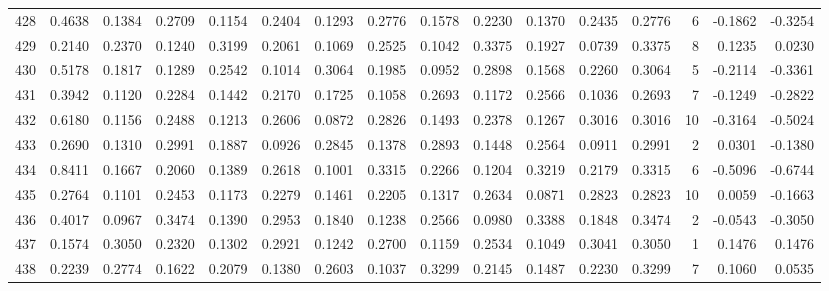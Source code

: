 \begin{tabular}{lrrrrrrrrrrrrrrr}
428 &      0.4638 &  0.1384 &  0.2709 &  0.1154 &  0.2404 &  0.1293 &  0.2776 &  0.1578 &  0.2230 &  0.1370 &   0.2435 &     0.2776 &      6 &                   -0.1862 &                    -0.3254 \\
429 &      0.2140 &  0.2370 &  0.1240 &  0.3199 &  0.2061 &  0.1069 &  0.2525 &  0.1042 &  0.3375 &  0.1927 &   0.0739 &     0.3375 &      8 &                    0.1235 &                     0.0230 \\
430 &      0.5178 &  0.1817 &  0.1289 &  0.2542 &  0.1014 &  0.3064 &  0.1985 &  0.0952 &  0.2898 &  0.1568 &   0.2260 &     0.3064 &      5 &                   -0.2114 &                    -0.3361 \\
431 &      0.3942 &  0.1120 &  0.2284 &  0.1442 &  0.2170 &  0.1725 &  0.1058 &  0.2693 &  0.1172 &  0.2566 &   0.1036 &     0.2693 &      7 &                   -0.1249 &                    -0.2822 \\
432 &      0.6180 &  0.1156 &  0.2488 &  0.1213 &  0.2606 &  0.0872 &  0.2826 &  0.1493 &  0.2378 &  0.1267 &   0.3016 &     0.3016 &     10 &                   -0.3164 &                    -0.5024 \\
433 &      0.2690 &  0.1310 &  0.2991 &  0.1887 &  0.0926 &  0.2845 &  0.1378 &  0.2893 &  0.1448 &  0.2564 &   0.0911 &     0.2991 &      2 &                    0.0301 &                    -0.1380 \\
434 &      0.8411 &  0.1667 &  0.2060 &  0.1389 &  0.2618 &  0.1001 &  0.3315 &  0.2266 &  0.1204 &  0.3219 &   0.2179 &     0.3315 &      6 &                   -0.5096 &                    -0.6744 \\
435 &      0.2764 &  0.1101 &  0.2453 &  0.1173 &  0.2279 &  0.1461 &  0.2205 &  0.1317 &  0.2634 &  0.0871 &   0.2823 &     0.2823 &     10 &                    0.0059 &                    -0.1663 \\
436 &      0.4017 &  0.0967 &  0.3474 &  0.1390 &  0.2953 &  0.1840 &  0.1238 &  0.2566 &  0.0980 &  0.3388 &   0.1848 &     0.3474 &      2 &                   -0.0543 &                    -0.3050 \\
437 &      0.1574 &  0.3050 &  0.2320 &  0.1302 &  0.2921 &  0.1242 &  0.2700 &  0.1159 &  0.2534 &  0.1049 &   0.3041 &     0.3050 &      1 &                    0.1476 &                     0.1476 \\
438 &      0.2239 &  0.2774 &  0.1622 &  0.2079 &  0.1380 &  0.2603 &  0.1037 &  0.3299 &  0.2145 &  0.1487 &   0.2230 &     0.3299 &      7 &                    0.1060 &                     0.0535 \\

\end{tabular}
